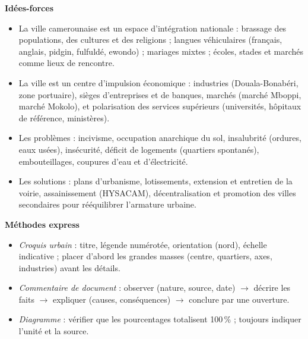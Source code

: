\documentclass[11pt]{article}
\newcommand{\cle}[1]{{\popxbold\color{popdark}#1}}
\begin{document}
\begin{bilan}
\textbf{Idées-forces}
\begin{itemize}
  \item La ville camerounaise est un \cle{espace d'intégration nationale} : brassage des populations, des cultures et des religions ; langues véhiculaires (français, anglais, pidgin, fulfuldé, ewondo) ; mariages mixtes ; écoles, stades et marchés comme lieux de rencontre.
  \item La ville est un \cle{centre d'impulsion économique} : industries (Douala-Bonabéri, zone portuaire), sièges d'entreprises et de banques, marchés (marché Mboppi, marché Mokolo), et polarisation des services supérieurs (universités, hôpitaux de référence, ministères).
  \item Les \cle{problèmes} : incivisme, occupation anarchique du sol, insalubrité (ordures, eaux usées), insécurité, déficit de logements (quartiers spontanés), embouteillages, coupures d'eau et d'électricité.
  \item Les \cle{solutions} : plans d'urbanisme, lotissements, extension et entretien de la voirie, assainissement (HYSACAM), décentralisation et promotion des villes secondaires pour rééquilibrer l'armature urbaine.
\end{itemize}

\textbf{Méthodes express}
\begin{itemize}
  \item \emph{Croquis urbain} : titre, légende numérotée, orientation (nord), échelle indicative ; placer d'abord les grandes masses (centre, quartiers, axes, industries) avant les détails.
  \item \emph{Commentaire de document} : observer (nature, source, date) $\rightarrow$ décrire les faits $\rightarrow$ expliquer (causes, conséquences) $\rightarrow$ conclure par une ouverture.
  \item \emph{Diagramme} : vérifier que les pourcentages totalisent 100\,\% ; toujours indiquer l'unité et la source.
\end{itemize}
\end{bilan}
\end{document}
